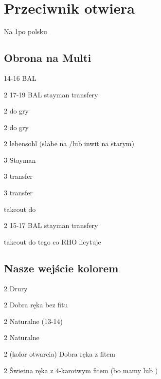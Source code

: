 \documentclass[12pt, a4paper]{article}
\begin{document}
\section*{Przeciwnik otwiera}

Na 1\nt po polsku

\subsection*{Obrona na Multi}

\compsequence{{2\diams\alrt}}
\begin{compoptions}[2]
	\item[\dbl] 14-16 BAL
	\item[2\nt] 17-19 BAL \then stayman transfery
\end{compoptions}

\compsequence{{2\diams\alrt}{\dbl}{\rdbl}}
\begin{compoptions}[4]
	\item[2\hearts] do gry
	\item[2\spades] do gry
	\item[2\nt] lebensohl (słabe na \clubs/\diams lub inwit na starym)
	\item[3\clubs] Stayman
	\item[3\diams] transfer \gf
	\item[3\hearts] transfer \gf
\end{compoptions}



\begin{compoptions}[4]
	\item[\dbl] takeout do \hearts
	\item[2\nt] 15-17 BAL \then stayman transfery
\end{compoptions}

\begin{compoptions}[4]
	\item[\dbl] takeout do tego co RHO licytuje
\end{compoptions}



\subsection*{Nasze wejście kolorem}

\begin{compoptions}[4]
	\item[2\clubs\alrt] Drury \imp
	\item[2\diams\alrt] Dobra ręka bez fitu
	\item[2\nt] Naturalne (13-14)
\end{compoptions}


\compsequence{{1\diams}{1\spades}{[coś]}}
\begin{compoptions}[4]
	\item[2\clubs] Naturalne \imp
	\item[2\diams\alrt] (kolor otwarcia) Dobra ręka z fitem \imp
	\item[2\nt] Świetna ręka z 4-karotwym fitem (bo mamy \dbl lub \rdbl) \vimp
\end{compoptions}
\end{document}
